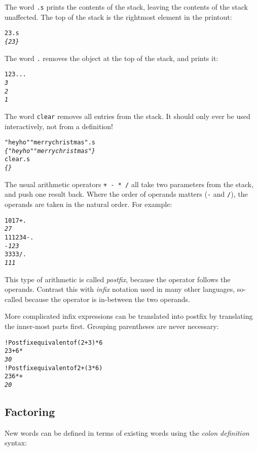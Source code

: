 \documentclass[english]{article}
\begin{document}
The word \texttt{.s} prints the contents of the stack, leaving the
contents of the stack unaffected. The top of the stack is the rightmost
element in the printout:

\begin{alltt}
2 3 .s
\emph{\{ 2 3 \}}
\end{alltt}

The word \texttt{.} removes the object at the top of the stack, and
prints it:

\begin{alltt}
1 2 3 . . .
\emph{3}
\emph{2}
\emph{1}
\end{alltt}

The word \texttt{clear} removes all entries from the stack. It should only ever be used interactively, not from a definition!

\begin{alltt}
"hey ho" "merry christmas" .s
\emph{\{ "hey ho" "merry christmas" \}}
clear .s
\emph{\{ \}}
\end{alltt}

The usual arithmetic operators \texttt{+ - {*} /} all take two parameters
from the stack, and push one result back. Where the order of operands
matters (\texttt{-} and \texttt{/}), the operands are taken in the natural order. For example:

\begin{alltt}
10 17 + .
\emph{27}
111 234 - .
\emph{-123}
333 3 / .
\emph{111}
\end{alltt}

This type of arithmetic is called \emph{postfix}, because the operator
follows the operands. Contrast this with \emph{infix} notation used
in many other languages, so-called because the operator is in-between
the two operands.

More complicated infix expressions can be translated into postfix
by translating the inner-most parts first. Grouping parentheses are
never necessary:

\begin{alltt}
! Postfix equivalent of (2 + 3) {*} 6
2 3 + 6 {*}
\emph{30}
! Postfix equivalent of 2 + (3 {*} 6)
2 3 6 {*} +
\emph{20}
\end{alltt}

\subsection{Factoring}

New words can be defined in terms of existing words using the \emph{colon
definition} syntax:
\end{document}
